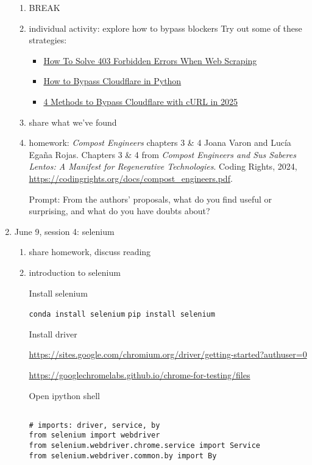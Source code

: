 \documentclass[11pt]{article}
\begin{document}
\begin{enumerate}
\begin{enumerate}
\item BREAK
\label{sec:org7578075}
\item individual activity: explore how to bypass blockers
\label{sec:org10174f0}
Try out some of these strategies: 
\begin{itemize}
\item \href{https://scrapeops.io/web-scraping-playbook/403-forbidden-error-web-scraping/}{How To Solve 403 Forbidden Errors When Web Scraping}
\item \href{https://www.zenrows.com/blog/bypass-cloudflare-python}{How to Bypass Cloudflare in Python}
\item \href{https://www.zenrows.com/blog/curl-bypass-cloudflare\#set-real-http-headers}{4 Methods to Bypass Cloudflare with cURL in 2025}
\end{itemize}

\item share what we've found
\label{sec:org277e8ab}
\item homework: \emph{Compost Engineers} chapters 3 \& 4
\label{sec:orge27db02}
Joana Varon and Lucía Egaña Rojas. Chapters 3 \& 4 from \emph{Compost
Engineers and Sus Saberes Lentos: A Manifest for Regenerative
Technologies}. Coding Rights, 2024,
\url{https://codingrights.org/docs/compost\_engineers.pdf}.

Prompt: From the authors' proposals, what do you find useful or
surprising, and what do you have doubts about?
\end{enumerate}

\item June 9, session 4: selenium
\label{sec:org7edf962}
\begin{enumerate}
\item share homework, discuss reading
\label{sec:orgb5759a8}
\item introduction to selenium
\label{sec:orga7e5019}

Install selenium

\texttt{conda install selenium}
\texttt{pip install selenium}

Install driver

\url{https://sites.google.com/chromium.org/driver/getting-started?authuser=0}

\url{https://googlechromelabs.github.io/chrome-for-testing/files}

Open ipython shell

\begin{verbatim}

# imports: driver, service, by
from selenium import webdriver
from selenium.webdriver.chrome.service import Service
from selenium.webdriver.common.by import By


\end{verbatim}
\end{enumerate}
\end{enumerate}
\end{document}
